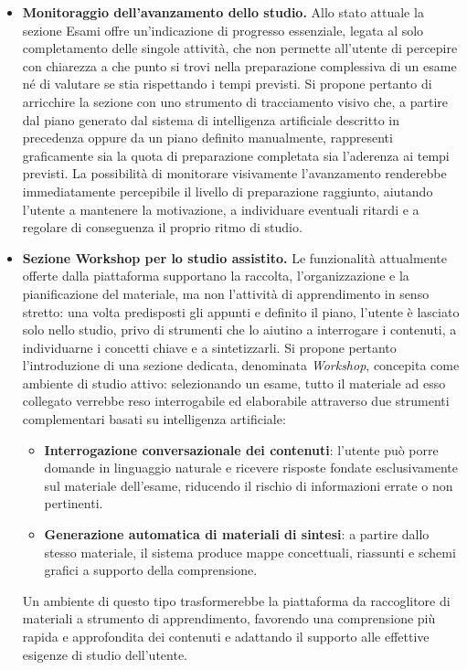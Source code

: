 \begin{itemize}
  \item \textbf{Monitoraggio dell'avanzamento dello studio.} Allo stato attuale
  la sezione Esami offre un'indicazione di progresso essenziale, legata al solo
  completamento delle singole attività, che non permette all'utente di percepire
  con chiarezza a che punto si trovi nella preparazione complessiva di un esame
  né di valutare se stia rispettando i tempi previsti. Si propone pertanto di
  arricchire la sezione con uno strumento di tracciamento visivo che, a partire
  dal piano generato dal sistema di intelligenza artificiale descritto in
  precedenza oppure da un piano definito manualmente, rappresenti graficamente
  sia la quota di preparazione completata sia l'aderenza ai tempi previsti. La
  possibilità di monitorare visivamente l'avanzamento renderebbe immediatamente
  percepibile il livello di preparazione raggiunto, aiutando l'utente a mantenere
  la motivazione, a individuare eventuali ritardi e a regolare di conseguenza il
  proprio ritmo di studio.

  \item \textbf{Sezione Workshop per lo studio assistito.} Le funzionalità
  attualmente offerte dalla piattaforma supportano la raccolta, l'organizzazione
  e la pianificazione del materiale, ma non l'attività di apprendimento in senso
  stretto: una volta predisposti gli appunti e definito il piano, l'utente è
  lasciato solo nello studio, privo di strumenti che lo aiutino a interrogare i
  contenuti, a individuarne i concetti chiave e a sintetizzarli. Si propone
  pertanto l'introduzione di una sezione dedicata, denominata \textit{Workshop},
  concepita come ambiente di studio attivo: selezionando un esame, tutto il
  materiale ad esso collegato verrebbe reso interrogabile ed elaborabile
  attraverso due strumenti complementari basati su intelligenza artificiale:
  \begin{itemize}
    \item \textbf{Interrogazione conversazionale dei contenuti}: l'utente può
    porre domande in linguaggio naturale e ricevere risposte fondate
    esclusivamente sul materiale dell'esame, riducendo il rischio di
    informazioni errate o non pertinenti.
    \item \textbf{Generazione automatica di materiali di sintesi}: a partire
    dallo stesso materiale, il sistema produce mappe concettuali, riassunti e
    schemi grafici a supporto della comprensione.
  \end{itemize}
  Un ambiente di questo tipo trasformerebbe la piattaforma da raccoglitore di
  materiali a strumento di apprendimento, favorendo una comprensione più rapida
  e approfondita dei contenuti e adattando il supporto alle effettive esigenze
  di studio dell'utente.


\end{itemize}
